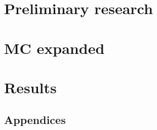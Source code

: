 \part{Preliminary research}
   

   

\newpage
\part{MC expanded}\label{part:mcexpanded}
   

   
   

   


\part{Results}
   

   
   


\begin{appendices}
   \part{Appendices}
   
   
	
	
\end{appendices}


